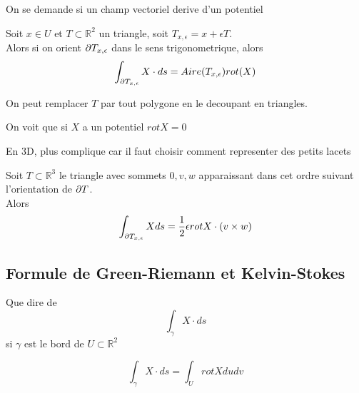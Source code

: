 \documentclass[../main.tex]{subfiles}
\begin{document}
On se demande si un champ vectoriel derive d'un potentiel

\begin{propo}
Soit $x\in U$ et $T \subset \mathbb{R}^{2}$ un triangle, soit $T_{x,\epsilon} = x + \epsilon T$.\\
Alors si on orient $\partial T_{x,\epsilon} $ dans le sens trigonometrique, alors
\[ 
\int_{ \partial T_{x,\epsilon}  }^{  }X\cdot ds = Aire( T_{x,\epsilon} ) rot( X) 
\]

\end{propo}
\begin{crly}
On peut remplacer $T$ par tout polygone en le decoupant en triangles.
\end{crly}
\begin{rmq}
On voit que si $X$  a un potentiel $rot X =0$ 
\end{rmq}
En 3D, plus complique car il faut choisir comment representer des petits lacets
\begin{propo}
Soit $T \subset \mathbb{R}^{3}$ le  triangle avec sommets $0,v,w$ apparaissant dans cet ordre suivant l'orientation de $\partial T$.\\
Alors 
\[ 
\int_{ \partial T_{x,\epsilon}  }^{  } X ds = \frac{1}{2}\epsilon rot X \cdot ( v\times w) 
\]

\end{propo}
\subsection{Formule de Green-Riemann et Kelvin-Stokes}
Que dire de 
\[ 
\int_{ \gamma }^{  }X \cdot ds
\]
si $\gamma$ est le bord de $U \subset \mathbb{R}^{2}$ 
\begin{thm}
	\[ 
	\int_{\gamma} X\cdot ds = \int_{ U }^{  }rot X du dv
	\]
	
\end{thm}
\end{document}
